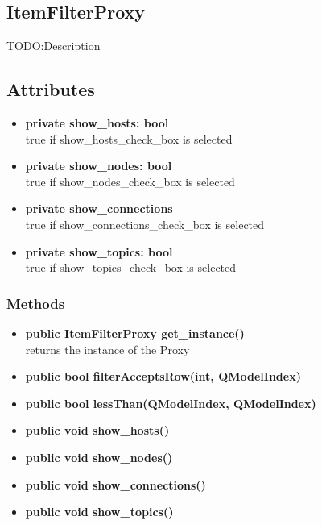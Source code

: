 \subsection{ItemFilterProxy}
TODO:Description
\subsection{Attributes}
\begin{itemize}
  \item \textbf{private show\_hosts: bool}\\
  true if show\_hosts\_check\_box is selected
  \item \textbf{private show\_nodes: bool}\\
  true if show\_nodes\_check\_box is selected
  \item \textbf{private show\_connections}\\
  true if show\_connections\_check\_box is selected
  \item \textbf{private show\_topics: bool}\\
  true if show\_topics\_check\_box is selected
\end{itemize}
\subsubsection{Methods}
\begin{itemize}
  
  \item \textbf{public ItemFilterProxy get\_instance()}\\
  returns the instance of the Proxy
  \item \textbf{public bool filterAcceptsRow(int, QModelIndex)}\\
  
  \item \textbf{public bool lessThan(QModelIndex, QModelIndex)}\\
  
  \item \textbf{public void show\_hosts()}\\
  
  \item \textbf{public void show\_nodes()}\\
  
  \item \textbf{public void show\_connections()}\\
  
  \item \textbf{public void show\_topics()}\\
  
\end{itemize}

